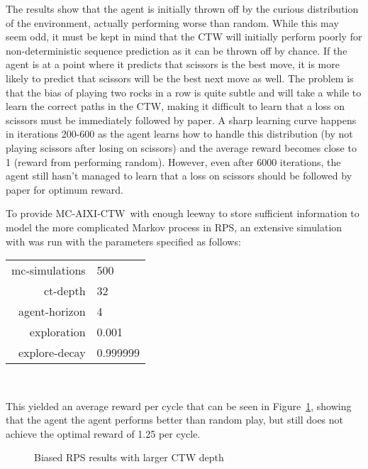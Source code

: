 \documentclass[pdftex,twoside,a4paper]{report}
\newcommand{\mac}{MC-AIXI-CTW}
\begin{document}
The results show that the agent is initially thrown off by the curious distribution of the environment, actually performing worse than random. While this may seem odd, it must be kept in mind that the CTW will initially perform poorly for non-deterministic sequence prediction as it can be thrown off by chance. If the agent is at a point where it predicts that scissors is the best move, it is more likely to predict that scissors will be the best next move as well. The problem is that the bias of playing two rocks in a row is quite subtle and will take a while to learn the correct paths in the CTW, making it difficult to learn that a loss on scissors must be immediately followed by paper. A sharp learning curve happens in iterations 200-600 as the agent learns how to handle this distribution (by not playing scissors after losing on scissors) and the average reward becomes close to 1 (reward from performing random). However, even after 6000 iterations, the agent still hasn't managed to learn that a loss on scissors should be followed by paper for optimum reward.


To provide \mac\ with enough leeway to store sufficient information to model
the more complicated Markov process in RPS, an extensive simulation with was
run with the parameters specified as follows:
\begin{center}
\begin{tabular}{| r | l | }
\hline
mc-simulations & 500\\
ct-depth & 32\\
agent-horizon & 4\\
exploration & 0.001\\
explore-decay & 0.999999\\
\hline
\end{tabular}\\
\end{center}

This yielded an average reward per cycle that can be seen in
Figure~\ref{fig:rps_results_ctw}, showing that the agent the agent performs
better than random play, but still does not achieve the optimal reward of 1.25
per cycle.

\begin{figure}[h]
  \begin{center}
  \end{center}
  \caption{Biased RPS results with larger CTW depth}
  \label{fig:rps_results_ctw}
\end{figure}
\end{document}
